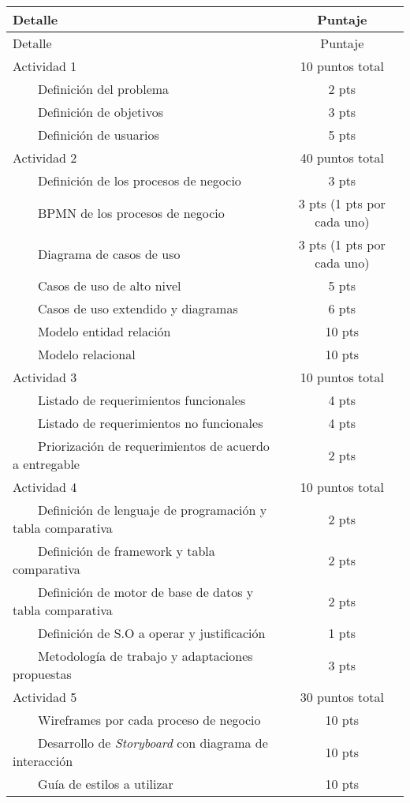 \documentclass[]{article}
\newcommand{\tabitem}{~~\llap{\textbullet}~~}
\begin{document}
\begin{longtable}[c]{|l|c|}
    \hline
    Detalle & Puntaje \\
    \hline
    \endfirsthead

    \hline
    Detalle & Puntaje \\
    \hline
    \endhead

    Actividad 1 & 10 puntos total \\
    \tabitem Definición del problema & 2 pts\\
    \tabitem Definición de objetivos & 3 pts\\
    \tabitem Definición de usuarios & 5 pts \\
    \hline
    Actividad 2 & 40 puntos total \\
    \tabitem Definición de los procesos de negocio & 3 pts \\
    \tabitem BPMN de los procesos de negocio & 3 pts (1 pts por cada uno) \\
    \tabitem Diagrama de casos de uso & 3 pts (1 pts por cada uno) \\
    \tabitem Casos de uso de alto nivel & 5 pts \\
    \tabitem Casos de uso extendido y diagramas & 6 pts \\
    \tabitem Modelo entidad relación & 10 pts \\
    \tabitem Modelo relacional & 10 pts \\
    \hline
    Actividad 3 & 10 puntos total \\
    \tabitem Listado de requerimientos funcionales & 4 pts \\
    \tabitem Listado de requerimientos no funcionales & 4 pts \\
    \tabitem Priorización de requerimientos de acuerdo a entregable & 2 pts \\ 
    \hline
    Actividad 4 & 10 puntos total \\
    \tabitem Definición de lenguaje de programación y tabla comparativa & 2 pts \\
    \tabitem Definición de framework y tabla comparativa & 2 pts \\
    \tabitem Definición de motor de base de datos y tabla comparativa & 2 pts \\
    \tabitem Definición de S.O a operar y justificación & 1 pts \\
    \tabitem Metodología de trabajo y adaptaciones propuestas & 3 pts \\
    \hline
    Actividad 5 & 30 puntos total \\
    \tabitem Wireframes por cada proceso de negocio & 10 pts \\
    \tabitem Desarrollo de \textit{Storyboard} con diagrama de interacción & 10 pts \\
    \tabitem Guía de estilos a utilizar & 10 pts \\
    \hline
\end{longtable}
\end{document}
